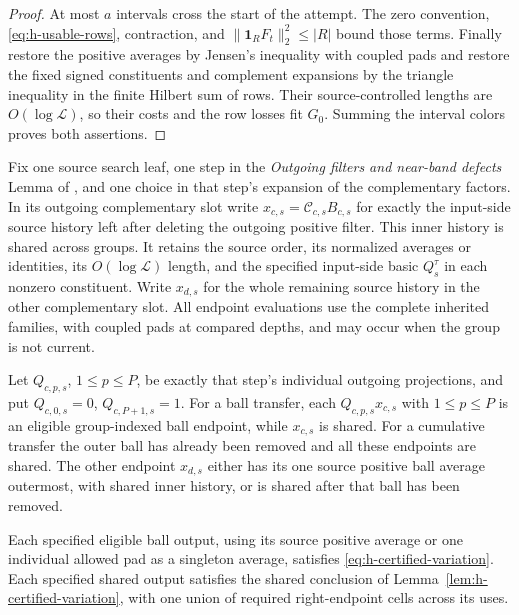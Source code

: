 \begin{proof}
At most \(a\) intervals cross the start of the attempt.  The zero
convention, \eqref{eq:h-usable-rows}, contraction, and
\(\|\mathbf1_R F_t\|_2^2\le|R|\) bound those terms.  Finally restore the
positive averages by Jensen's inequality with coupled pads and
restore the fixed signed constituents and complement expansions
by the triangle inequality in the finite Hilbert sum of rows.
Their source-controlled lengths are \(O(\log\mathcal L)\), so
their costs and the row losses fit \(G_0\).  Summing the interval
colors proves both assertions.
\end{proof}

\begin{corollary}
\label{cor:h-transfer-endpoint-variation}
Fix one source search leaf, one step in the
\emph{Outgoing filters and near-band defects} Lemma of
\cite[Section~6]{H}, and one choice in that step's expansion of
the complementary factors.  In its outgoing complementary slot
write \(x_{c,s}=\mathcal C_{c,s}B_{c,s}\) for exactly the
input-side source history left after deleting the outgoing positive
filter.  This inner history is shared across groups.  It retains
the source order, its normalized averages or
identities, its \(O(\log\mathcal L)\) length, and the specified
input-side basic \(Q_s^\tau\) in each nonzero constituent.  Write
\(x_{d,s}\) for the whole remaining source history in the other
complementary slot.  All endpoint evaluations use the complete
inherited families, with coupled pads at compared depths, and may
occur when the group is not current.

Let \(Q_{c,p,s}\), \(1\le p\le P\), be exactly that step's
individual outgoing projections, and put
\(Q_{c,0,s}=0\), \(Q_{c,P+1,s}=1\).
For a ball transfer, each \(Q_{c,p,s}x_{c,s}\) with
\(1\le p\le P\) is an eligible group-indexed ball endpoint, while
\(x_{c,s}\) is shared.  For a cumulative transfer the outer ball
has already been removed and all these endpoints are shared.
The other endpoint \(x_{d,s}\) either has its one source positive
ball average outermost, with shared inner history, or is shared
after that ball has been removed.

Each specified eligible ball output, using its source positive
average or one individual allowed pad as a singleton average,
satisfies \eqref{eq:h-certified-variation}.  Each specified shared
output satisfies the shared conclusion of
Lemma~\ref{lem:h-certified-variation}, with one union of required
right-endpoint cells across its uses.
\end{corollary}


